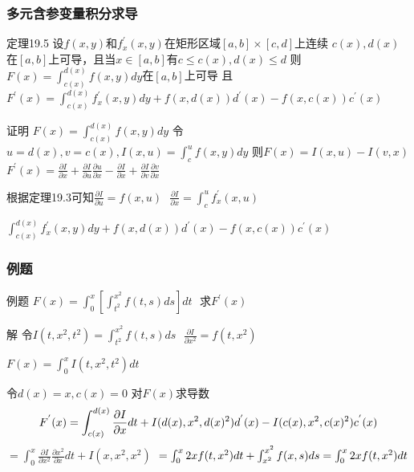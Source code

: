 \documentclass[xetex]{beamer}
\begin{document}
\begin{frame}
    \frametitle{多元含参变量积分求导}
    \begin{block}{定理19.5}
        设$f(x,y)$和$f_x^{'}(x,y)$在矩形区域$[a,b]\times[c,d]$上连续
        $c(x),d(x)$在$[a,b]$上可导，且当$x\in [a,b]$有$c\le c(x),d(x)\le d$
        则$F(x)=\int_{c(x)}^{d(x)}{f(x,y)dy}$在$[a,b]$上可导
        且$F^{'}(x)=\int_{c(x)}^{d(x)}{f^{'}_x(x,y)dy}+f(x,d(x))d^{'}(x)-f(x,c(x))c^{'}(x)$
    \end{block}
    \begin{block}{证明}
        $F(x)=\int_{c(x)}^{d(x)}{f(x,y)dy}$
        令$u=d(x), v=c(x), I(x,u)=\int_c^{u}{f(x,y)dy}$
        则$F(x)=I(x,u)-I(v,x)$ 
        $F^{'}(x)=\frac{\partial I}{\partial x} + \frac{\partial I}{\partial u} \frac{\partial u}{\partial x} 
        - \frac{\partial I}{\partial x} + \frac{\partial I}{\partial v} \frac{\partial v}{\partial x}$
        
        根据定理19.3可知$\frac{\partial I}{\partial u}=f(x,u) \ \ \ \frac{\partial I}{\partial x}=\int_c^{u}{f^{'}_x(x,u)}$
        
        $\int_{c(x)}^{d(x)}{f^{'}_x(x,y)dy}+f(x,d(x))d^{'}(x)-f(x,c(x))c^{'}(x)$
    \end{block}
\end{frame}

\begin{frame}
    \frametitle{例题}
    \begin{block}{例题}
        $F(x)=\int_{0}^{x}{[\int_{t^2}^{x^2}f(t,s)ds]dt}\ \ \ $求$F^{'}(x)$
    \end{block}
    \begin{block}{解}
        令$I(t, x^2, t^2)=\int_{t^2}^{x^2}{f(t,s)ds} \ \ \ \frac{\partial I}{\partial x^2}=f(t,x^2)\ $
        
        $F(x)=\int_{0}^{x}{I(t,x^2,t^2)dt}$
        
        令$d(x)=x, c(x)=0$
        对$F(x)$求导数
        $$\newline F^{'}(x)=\int_{c(x)}^{d(x)}{\frac{\partial I}{\partial x}dt}+I(d(x),x^2,d(x)^2)d^{'}(x)-I(c(x),x^2,c(x)^2)c^{'}(x)$$
        \Large $=\int_{0}^{x}{\frac{\partial I}{\partial x^2}\frac{\partial x^2}{\partial x}dt}+I(x,x^2,x^2)$
        \linespread{1.7}\Large $\newline=\int_{0}^{x}{2xf(t,x^2)dt}+\int_{x^2}^{x^2}{f(x,s)ds}
        =\int_{0}^{x}{2xf(t,x^2)dt}$

    \end{block}
\end{frame}
\end{document}
